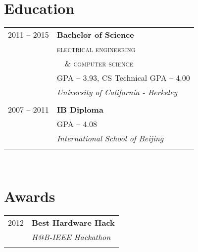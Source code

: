 \documentclass[10pt]{article} %
\begin{document}
{\begin{minipage}[t]{0.44\textwidth}

\section{Education} 

\begin{tabular}{ll} %


2011 -- 2015 & \textbf{Bachelor of Science} \\ 
& \textsc{electrical engineering} \\
& \,\,\,\, \textsc{\& computer science} \\ 
& \small GPA -- 3.93, CS Technical GPA -- 4.00 \\
& \textit{University of California - Berkeley}\\
&\\
	 

2007 -- 2011 & \textbf{IB Diploma} \\ 
& \small GPA -- 4.08 \\
& \textit{International School of Beijing}\\
&\\
	 

\end{tabular}\\


\section{Awards} 

\begin{tabular}{rl}
2012	 & \textbf{Best Hardware Hack}\\
& \textit{H@B-IEEE Hackathon}\\ \\


\end{tabular}
\end{minipage}}
\end{document}
